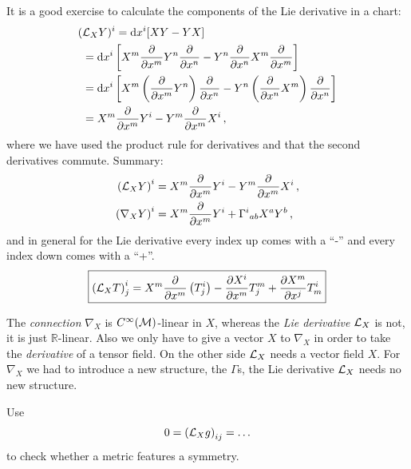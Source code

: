 \documentclass[11pt, a4paper, twocolumn]{article} %
\begin{document}
    It is a good exercise to calculate the components of the Lie derivative in a chart:
    \begin{align*}
        (&\mathcal{L}_X Y)^i = \operatorname{d\!} x^i [XY - YX] \\
        &= \operatorname{d\!} x^i \left[ X^m \frac{\partial}{\partial x^m}Y^n \frac{\partial}{\partial x^n}
        - Y^n\frac{\partial}{\partial x^n} X^m \frac{\partial}{\partial x^m}\right]\\
        &= \operatorname{d\!} x^i \left[ X^m \left( \frac{\partial}{\partial x^m} Y^n \right) \frac{\partial}{\partial x^n}
        - Y^n \left( \frac{\partial}{\partial x^n} X^m \right)\frac{\partial}{\partial x^n}\right]\\
        &= X^m\frac{\partial}{\partial x^m}Y^i - Y^m \frac{\partial}{\partial x^m}X^i\,,
    \end{align*}
    where we have used the product rule for derivatives and that the second derivatives commute.
    Summary:
    \begin{align}
        \left( \mathcal{L}_X Y \right)^i &= X^m\frac{\partial}{\partial x^m}Y^i - Y^m \frac{\partial}{\partial x^m}X^i\,,\\
        \left( \nabla_X Y \right)^i &= X^m\frac{\partial}{\partial x^m}Y^i + \Gamma^i{}_{ab}X^a Y^b\,,
    \end{align}
    and in general for the Lie derivative every index up comes with a ``-'' and every index down
    comes with a ``+''.
    \begin{equation}
        \boxed{%
         \left( \Lie_X T \right)^i_j = X^m \frac{\partial}{\partial x^m}\left( T^i_j \right) -
        \frac{\partial X^i}{\partial x^m}T^m_j
        + \frac{\partial X^m}{\partial x^j}T^i_m
    }
    \end{equation}
    \begin{center}
    \end{center}
    \begin{note}
        The \textit{connection} $\nabla_X$ is $C^\infty(\mathcal{M})$-linear in $X$,
        whereas the \textit{Lie derivative} $\mathcal{L}_X$ is not, it is just $\mathbb{R}$-linear.
        Also we only have to give a vector $X$ to $\nabla_X$ in order to take the \textit{derivative}
        of a tensor field.
        On the other side $\mathcal{L}_X$ needs a vector field $X$.
        For $\nabla_X$ we had to introduce a new structure, the $\Gamma$s, the Lie derivative $\mathcal{L}_X$
        needs no new structure.
    \end{note}
    \begin{note}
        Use
        \begin{equation}
            0 = \left( \mathcal{L}_X g \right)_{ij} = \ldots
        \end{equation}
        to check whether a metric features a symmetry.
    \end{note}
\end{document}
